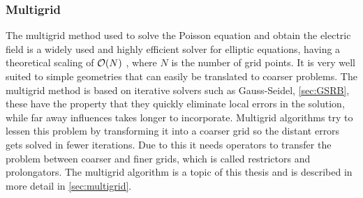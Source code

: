     \subsubsection{Multigrid}

        The multigrid method used to solve the Poisson equation and obtain the
        electric field is a widely used and highly efficient solver for elliptic equations,
        having a theoretical scaling of \(\order{N}\) \citep{press_numerical_1988},
        where \(N\) is the number of grid points. It is very well suited to simple geometries
        that can easily be translated to coarser problems.
        The multigrid method is based on iterative
        solvers such as Gauss-Seidel, \cref{sec:GSRB}, these have the property
        that they quickly eliminate local errors in the solution, while far
        away influences takes longer to incorporate. Multigrid algorithms try
        to lessen this problem by transforming it into a coarser grid
        so the distant errors gets solved in fewer iterations. Due to this it needs
        operators to transfer the problem between coarser and finer grids, which
        is called restrictors and prolongators. The multigrid algorithm is a topic of this thesis and is described in
        more detail in \cref{sec:multigrid}.

